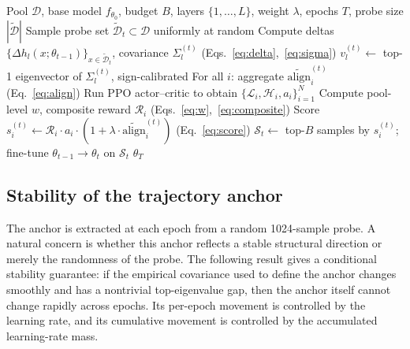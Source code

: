 \begin{algorithm}[t]
\caption{Trajectory-Anchored Dynamic Selection (TADS)}
\label{alg:tads}
\begin{algorithmic}[1]
\REQUIRE Pool $\mathcal{D}$, base model $f_{\theta_0}$, budget $B$,
         layers $\{1,\ldots,L\}$, weight $\lambda$, epochs $T$,
         probe size $|\widetilde{\mathcal{D}}|$
  \STATE Sample probe set
         $\widetilde{\mathcal{D}}_t \subset \mathcal{D}$ uniformly at random
    \STATE Compute deltas
           $\{\Delta h_l(x; \theta_{t-1})\}_{x \in \widetilde{\mathcal{D}}_t}$,
           covariance $\Sigma_l^{(t)}$
           \hfill (Eqs.~\ref{eq:delta},~\ref{eq:sigma})
    \STATE $v_l^{(t)} \leftarrow$ top-1 eigenvector of $\Sigma_l^{(t)}$,
           sign-calibrated
  \ENDFOR
  \STATE For all $i$: aggregate
         $\widetilde{\mathrm{align}}_i^{(t)}$
         \hfill (Eq.~\ref{eq:align})
  \STATE Run PPO actor--critic to obtain
         $\{\mathcal{L}_i, \mathcal{H}_i, a_i\}_{i=1}^N$
  \STATE Compute pool-level $w$, composite reward $\mathcal{R}_i$
         \hfill (Eqs.~\ref{eq:w},~\ref{eq:composite})
  \STATE Score
         $s_i^{(t)} \leftarrow
          \mathcal{R}_i \cdot a_i \cdot
          (1 + \lambda \cdot \widetilde{\mathrm{align}}_i^{(t)})$
         \hfill (Eq.~\ref{eq:score})
  \STATE $\mathcal{S}_t \leftarrow$ top-$B$ samples by $s_i^{(t)}$;
         fine-tune $\theta_{t-1} \to \theta_t$ on $\mathcal{S}_t$
\ENDFOR
\RETURN $\theta_T$
\end{algorithmic}
\end{algorithm}

\subsection{Stability of the trajectory anchor}
\label{sec:method-theory}

The anchor is extracted at each epoch from a random 1024-sample
probe. A natural concern is whether this anchor reflects a stable
structural direction or merely the randomness of the probe. The
following result gives a conditional stability guarantee: if the
empirical covariance used to define the anchor changes smoothly and
has a nontrivial top-eigenvalue gap, then the anchor itself cannot
change rapidly across epochs. Its per-epoch movement is controlled
by the learning rate, and its cumulative movement is controlled by
the accumulated learning-rate mass.

